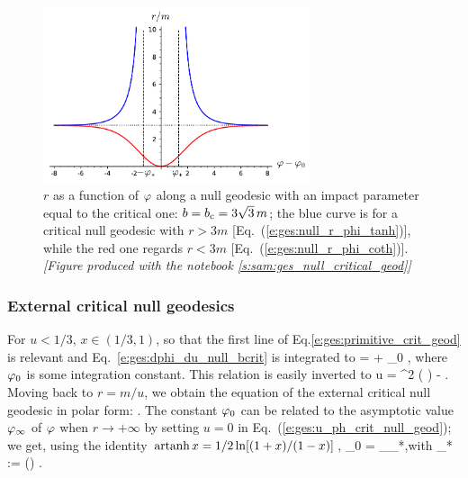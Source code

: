 \begin{figure}
\centerline{\includegraphics[width=0.7\textwidth]{ges_null_r_phi_bcrit.pdf}}
\caption[]{\label{f:gis:null_r_phi_bcrit} \footnotesize
$r$ as a function of $\varphi$ along a null geodesic with an impact parameter
equal to the critical one:
$b = b_{\rm c} = 3\sqrt{3} \, m$; the blue curve is for a critical
null geodesic with $r>3m$
[Eq.~(\ref{e:ges:null_r_phi_tanh})], while the red one
regards $r<3m$ [Eq.~(\ref{e:ges:null_r_phi_coth})].
\textsl{[Figure produced with the notebook \ref{s:sam:ges_null_critical_geod}]}
}
\end{figure}

\subsubsection{External critical null geodesics} \label{s:gis:extern_crit_geod}

For $u<1/3$, $x\in(1/3, 1)$, so that the first line of Eq.\eqref{e:ges:primitive_crit_geod}
is relevant and Eq.~\eqref{e:ges:dphi_du_null_bcrit} is integrated to
\be \label{e:ges:ph_u_crit_null_geod}
    \ph =  \artanh {} + \ph_0 ,
\ee
where $\varphi_0$ is some integration constant. This relation is easily inverted
to
\be \label{e:ges:u_ph_crit_null_geod}
    u =   \tanh^2 \left( \right) -  .
\ee
Moving back to $r = m/u$, we obtain the equation of the external critical
null geodesic in polar form:
\be \label{e:ges:null_r_phi_tanh}
   .
\ee
The constant $\varphi_0$ can be related to the asymptotic value $\varphi_\infty$ of $\varphi$
when $r\to +\infty$ by setting $u=0$ in Eq.~(\ref{e:ges:u_ph_crit_null_geod});
we get, using the identity $\operatorname{artanh} x = 1/2\ln[(1+x)/(1-x)]$,
\be \label{e:ges:null_ph_0_ph_inf}
    \ph_0 = \ph_\infty \pm \ph_*,\quad\mbox{with}\quad
    \ph_* := \ln\left(\right)
    .
\ee

